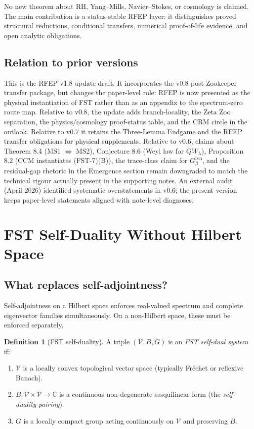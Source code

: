 \documentclass[11pt,a4paper]{article}
\theoremstyle{plain}
\theoremstyle{definition}
\newtheorem{definition}[theorem]{Definition}
\newcommand{\C}{\mathbb{C}}
\newcommand{\V}{\mathcal{V}}
\begin{document}
No new theorem about RH, Yang--Mills, Navier--Stokes, or cosmology is
claimed.  The main contribution is a status-stable RFEP layer: it
distinguishes proved structural reductions, conditional transfers,
numerical proof-of-life evidence, and open analytic obligations.

\subsection{Relation to prior versions}

This is the RFEP v1.8 update draft.  It incorporates the v0.8
post-Zookeeper transfer package, but changes the paper-level role:
RFEP is now presented as the physical instantiation of FST rather
than as an appendix to the spectrum-zero route map.  Relative to
v0.8, the update adds branch-locality, the Zeta Zoo separation, the
physics/cosmology proof-status table, and the CRM circle in the
outlook.  Relative to v0.7 it retains the Three-Lemma Endgame and the
RFEP transfer obligations for physical supplements.  Relative to
v0.6, claims about Theorem 8.4 (MS1 $\Leftrightarrow$ MS2),
Conjecture 8.6 (Weyl law for $QW_\lambda$), Proposition 8.2 (CCM
instantiates (FST-7)(B)), the trace-class claim for
$G_\beta^{\mathrm{ren}}$, and the residual-gap rhetoric in the
Emergence section remain downgraded to match the technical rigour
actually present in the supporting notes.  An external audit (April
2026) identified systematic overstatements in v0.6; the present
version keeps paper-level statements aligned with note-level
diagnoses.

\section{FST Self-Duality Without Hilbert Space}
\label{sec:fst-duality}

\subsection{What replaces self-adjointness?}

Self-adjointness on a Hilbert space enforces real-valued spectrum
and complete eigenvector families simultaneously.  On a non-Hilbert
space, these must be enforced separately.

\begin{definition}[FST self-duality]
\label{def:fst-duality}
A triple $(\V, B, G)$ is an \emph{FST self-dual system} if:
\begin{enumerate}[leftmargin=*]
  \item $\V$ is a locally convex topological vector space (typically
    Fr\'echet or reflexive Banach).
  \item $B: \V \times \V \to \C$ is a continuous non-degenerate
    sesquilinear form (the \emph{self-duality pairing}).
  \item $G$ is a locally compact group acting continuously on $\V$
    and preserving $B$.
\end{enumerate}
\end{definition}
\end{document}
